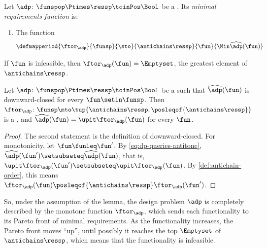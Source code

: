 \begin{definition}
    \label{def:dp-min-req-map}
    Let $\adp \colon \funspop \Ptimes \ressp \toinPos \Bool$ be a .
    Its \emph{minimal requirements function} is:

    \constit
    \begin{enumerate}
        \item The function
              \begin{equation}
                  \defmapperiod{
                      \ftor_{\adp}
                  }{
                      \funsp
                  }{
                      \sto
                  }{
                      \antichains \ressp
                  }{
                      \fun
                  }{
                      \Min \widehat{\adp}(\fun)
                  }
              \end{equation}
    \end{enumerate}
\end{definition}

If $\fun$ is infeasible, then $\ftor_{\adp}(\fun) = \Emptyset$, the greatest element of $\antichains \ressp$.

\begin{lemma}
    \label{lem:dp-min-req-map-monotone}
    Let $\adp \colon \funspop \Ptimes \ressp \toinPos \Bool$ be a  such that $\widehat{\adp}(\fun)$ is downward-closed for every $\fun \setin \funsp$.
    Then $\ftor_{\adp} \colon \funsp \mto \tup{\antichains \ressp, \posleqof{\antichains \ressp}}$ is a , and $\widehat{\adp}(\fun) = \upit \ftor_{\adp}(\fun)$ for every $\fun$.
\end{lemma}
\begin{proof}
    The second statement is the definition of downward-closed.
    For monotonicity, let $\fun \funleq \fun'$.
    By \cref{eq:dp-queries-antitone}, $\widehat{\adp}(\fun') \setsubseteq \widehat{\adp}(\fun)$, that is, $\upit \ftor_{\adp}(\fun') \setsubseteq \upit \ftor_{\adp}(\fun)$.
    By \cref{def:antichain-order}, this means $\ftor_{\adp}(\fun) \posleqof{\antichains \ressp} \ftor_{\adp}(\fun')$.
\end{proof}

So, under the assumption of the lemma, the design problem $\adp$ is completely described by the monotone function $\ftor_{\adp}$, which sends each functionality to its Pareto front of minimal requirements.
As the functionality increases, the Pareto front moves ``up'', until possibly it reaches the top $\Emptyset$ of $\antichains \ressp$, which means that the functionality is infeasible.


